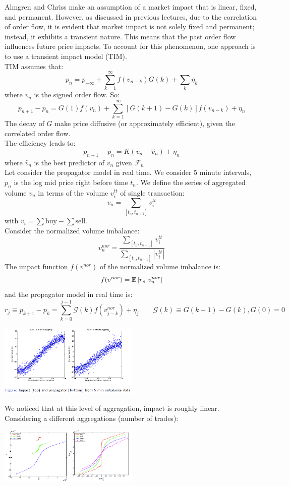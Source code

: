 Almgren and Chriss make an assumption of a market impact that is linear, fixed, and permanent. However, as discussed in previous lectures, due to the correlation of order flow, it is evident that market impact is not solely fixed and permanent; instead, it exhibits a transient nature. This means that the past order flow influences future price impacts. To account for this phenomenon, one approach is to use a transient impact model (TIM).\\
TIM assumes that:
\[
p_n = p_{-\infty} + \sum_{k=1}^{\infty}f(v_{n-k})G(k) + \sum_k \eta_k
\]
where $v_n$ is the signed order flow. So:
\[
p_{n+1} - p_n = G(1)f(v_n) + \sum_{k=1}^{\infty} [G(k+1) - G(k)]f(v_{n-k}) + \eta_n
\]
The decay of $G$ make price diffusive (or approximately efficient), given the correlated order flow.\\ The efficiency leads to:
\[
p_{n+1} - p_n = K(v_n - \hat{v}_n) + \eta_n
\]
where $\hat{v}_n$ is the best predictor of $v_n$ given $\mathcal{F}_n$\\
Let consider the propagator model in real time. We consider 5 minute intervals, $p_n$ is the log mid price right before time $t_n$. We define the series of aggregated volume $v_n$ in terms of the volume $v_i^{tt}$ of single transaction:
\[
v_n = \sum_{[t_n, t_{n+1}]} v_i^{tt}
\]
with $v_i = \sum \text{buy} - \sum \text{sell}$.\\
Consider the normalized volume imbalance:
\[
v_n^{nor} = \frac{\sum_{[t_n,t_{n+1}]} v_i^{tt}}{\sum_{[t_n,t_{n+1}]} |v_i^{tt}|}
\]
The impact function $f(v^{nor})$ of the normalized volume imbalance is:
\[
f(v^{nor}) = \mathbb{E}\left[r_n| v_n^{nor}\right]
\]
and the propagator model in real time is:
\[
r_j \equiv p_{k+1} - p_k = \sum_{k=0}^{j-1} \mathcal{G}(k) f(v_{j-k}^{nor}) +\eta_j \qquad \mathcal{G}(k) \equiv G(k+1) -G(k), G(0) = 0
\]
\begin{center}
	\includegraphics[width=0.5\textwidth]{picture/(10)market_impact_1.png}
\end{center}
We noticed that at this level of aggragation, impact is roughly linear.\\
Considering a different aggregations (number of trades):
\begin{center}
	\includegraphics[width=0.5\textwidth]{picture/(11)market_impact_2.png}
\end{center}
